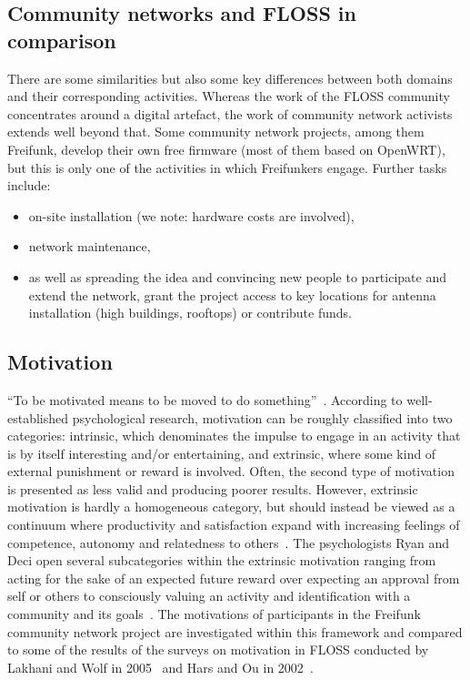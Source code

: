\documentclass{scrartcl}
\begin{document}
\subsection{Community networks and FLOSS in comparison}\label{subsec:comparison}
There are some similarities but also some key differences between both domains and their corresponding activities. %
Whereas the work of the FLOSS community concentrates around a digital artefact, the work of community network activists extends well beyond that.
Some community network projects, among them Freifunk, develop their own free firmware (most of them based on OpenWRT), but this is only one of the activities in which Freifunkers engage.
Further tasks include:
\begin{itemize}
  \item on-site installation (we note: hardware costs are involved),
  \item network maintenance,
  \item as well as spreading the idea and convincing new people to participate and extend the network, grant the project access to key locations for antenna installation (high buildings, rooftops) or contribute funds. %
\end{itemize}

\subsection{Motivation}\label{subsec:motivation}
``To be motivated means to be moved to do something''~\cite{RyDe2000}.
According to well-established psychological research, motivation can be roughly classified into two categories:
intrinsic, which denominates the impulse to engage in an activity that is by itself interesting and/or entertaining,
and extrinsic, where some kind of external punishment or reward is involved.
Often, the second type of motivation is presented as less valid and producing poorer results. %
However, extrinsic motivation is hardly a homogeneous category, but should instead be viewed as a continuum where productivity and satisfaction expand with increasing feelings of competence, autonomy and relatedness to others~\cite{RyDe2000}.
The psychologists Ryan and Deci open several subcategories within the extrinsic motivation ranging from acting for the sake of an expected future reward over expecting an approval from self or others to consciously valuing an activity and identification with a community and its goals~\cite{RyDe2000}.
The motivations of participants in the Freifunk community network project are investigated within this framework and compared to some of the results of the surveys on motivation in FLOSS conducted by Lakhani and Wolf in 2005~\cite{LakWo2005} and Hars and Ou in 2002~\cite{HarOu2002}.
\end{document}
